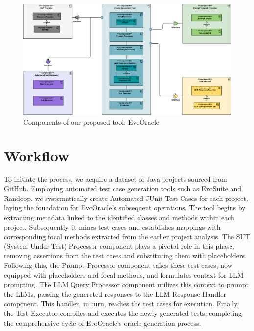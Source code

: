 \begin{figure}[H]
\centering
\includegraphics[width=1\textwidth]{images/EvoOracle_ components.png}
\caption{Components of our proposed tool: EvoOracle}
\label{fig:component_diagram}
\end{figure}

\section{Workflow}
\label{sec:workflow}
\vspace{0.2 cm}

To initiate the process, we acquire a dataset of Java projects sourced from GitHub. Employing automated test case generation tools such as EvoSuite and Randoop, we systematically create Automated JUnit Test Cases for each project, laying the foundation for EvoOracle's subsequent operations. The tool begins by extracting metadata linked to the identified classes and methods within each project. Subsequently, it mines test cases and establishes mappings with corresponding focal methods extracted from the earlier project analysis. The SUT (System Under Test) Processor component plays a pivotal role in this phase, removing assertions from the test cases and substituting them with placeholders. Following this, the Prompt Processor component takes these test cases, now equipped with placeholders and focal methods, and formulates context for LLM prompting. The LLM Query Processor component utilizes this context to prompt the LLMs, passing the generated responses to the LLM Response Handler component. This handler, in turn, readies the test cases for execution. Finally, the Test Executor compiles and executes the newly generated tests, completing the comprehensive cycle of EvoOracle's oracle generation process.

